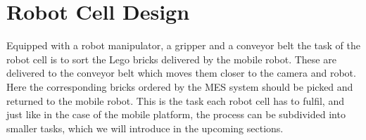 \chapter{Robot Cell Design}\label{chap:robot_cell_chapter}
Equipped with a robot manipulator, a gripper and a conveyor belt the task of the robot cell is to sort the Lego bricks delivered by the mobile robot. These are delivered to the conveyor belt which moves them closer to the camera and robot. Here the corresponding bricks ordered by the MES system should be picked and returned to the mobile robot. This is the task each robot cell has to fulfil, and just like in the case of the mobile platform, the process can be subdivided into smaller tasks, which we will introduce in the upcoming sections.
















